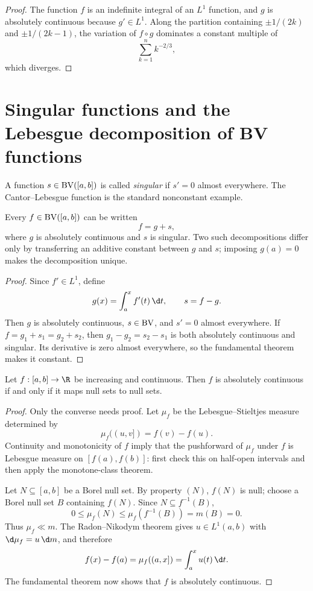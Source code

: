 \begin{proof}
The function $f$ is an indefinite integral of an $L^1$ function, and $g$ is absolutely continuous because $g'\in L^1$. Along the partition containing $\pm1/(2k)$ and $\pm1/(2k-1)$, the variation of $f\circ g$ dominates a constant multiple of
\[
\sum_{k=1}^{n}k^{-2/3},
\]
which diverges.
\end{proof}

\section{Singular functions and the Lebesgue decomposition of BV functions}

\begin{de}
A function $s\in\operatorname{BV}([a,b])$ is called \emph{singular} if $s'=0$ almost everywhere. The Cantor--Lebesgue function is the standard nonconstant example.
\end{de}

\begin{thm}
Every $f\in\operatorname{BV}([a,b])$ can be written
\[
f=g+s,
\]
where $g$ is absolutely continuous and $s$ is singular. Two such decompositions differ only by transferring an additive constant between $g$ and $s$; imposing $g(a)=0$ makes the decomposition unique.
\end{thm}

\begin{proof}
Since $f'\in L^1$, define
\[
g(x)=\int_a^x f'(t)\,\d t,
\qquad s=f-g.
\]
Then $g$ is absolutely continuous, $s\in\operatorname{BV}$, and $s'=0$ almost everywhere. If $f=g_1+s_1=g_2+s_2$, then $g_1-g_2=s_2-s_1$ is both absolutely continuous and singular. Its derivative is zero almost everywhere, so the fundamental theorem makes it constant.
\end{proof}

\begin{cor}
Let $f:[a,b]\to\R$ be increasing and continuous. Then $f$ is absolutely continuous if and only if it maps null sets to null sets.
\end{cor}

\begin{proof}
Only the converse needs proof. Let $\mu_f$ be the Lebesgue--Stieltjes measure determined by
\[
\mu_f((u,v])=f(v)-f(u).
\]
Continuity and monotonicity of $f$ imply that the pushforward of $\mu_f$ under $f$ is Lebesgue measure on $[f(a),f(b)]$: first check this on half-open intervals and then apply the monotone-class theorem.

Let $N\subseteq[a,b]$ be a Borel null set. By property $(N)$, $f(N)$ is null; choose a Borel null set $B$ containing $f(N)$. Since $N\subseteq f^{-1}(B)$,
\[
0\leq\mu_f(N)\leq\mu_f(f^{-1}(B))=m(B)=0.
\]
Thus $\mu_f\ll m$. The Radon--Nikodym theorem gives $u\in L^1(a,b)$ with $\d\mu_f=u\,\d m$, and therefore
\[
f(x)-f(a)=\mu_f((a,x])=\int_a^xu(t)\,\d t.
\]
The fundamental theorem now shows that $f$ is absolutely continuous.
\end{proof}

